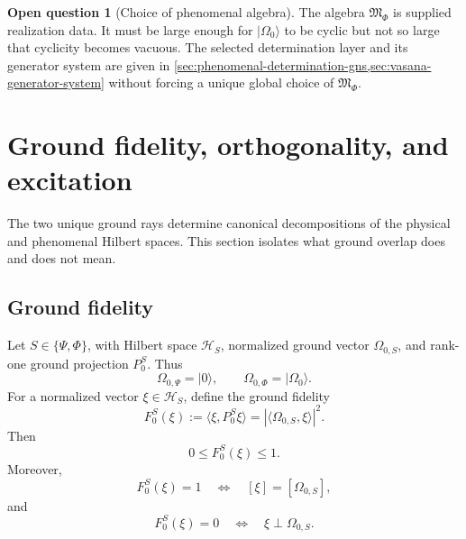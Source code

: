 \documentclass[11pt,reqno]{scrartcl}
\newcommand{\algF}{\mathfrak M_{\Phi}}
\newcommand{\ket}[1]{\lvert #1\rangle}
\newcommand{\inner}[2]{\langle #1,#2\rangle}
\theoremstyle{plain}
\theoremstyle{definition}
\newtheorem{openquestion}[openquestion]{Open question}
\theoremstyle{remark}
\begin{document}
\begin{openquestion}[Choice of phenomenal algebra]
\label{q:phenomenal-algebra}
The algebra $\algF$ is supplied realization data.  It must be large enough
for $\ket{\Omega_0}$ to be cyclic but not so large that cyclicity becomes
vacuous.  The selected determination layer and its generator system are given
in \cref{sec:phenomenal-determination-gns,sec:vasana-generator-system} without
forcing a unique global choice of $\algF$.
\end{openquestion}
\section{Ground fidelity, orthogonality, and excitation}
\label{sec:ground-fidelity}

The two unique ground rays determine canonical decompositions of the physical
and phenomenal Hilbert spaces.  This section isolates what ground overlap does
and does not mean.

\subsection{Ground fidelity}

Let $S\in\{\Psi,\Phi\}$, with Hilbert space $\mathscr H_S$, normalized ground
vector $\Omega_{0,S}$, and rank-one ground projection $P_0^S$.  Thus
\begin{equation}
  \Omega_{0,\Psi}=\ket0,
  \qquad
  \Omega_{0,\Phi}=\ket{\Omega_0}.
\end{equation}
For a normalized vector $\xi\in\mathscr H_S$, define the ground fidelity
\begin{equation}
  \boxed{
  F_0^S(\xi)
  :=\inner{\xi}{P_0^S\xi}
  =|\inner{\Omega_{0,S}}{\xi}|^2.}
  \label{eq:ground-fidelity-general}
\end{equation}
Then
\begin{equation}
  0\leq F_0^S(\xi)\leq1.
\end{equation}
Moreover,
\begin{equation}
  F_0^S(\xi)=1
  \quad\Longleftrightarrow\quad
  [\xi]=[\Omega_{0,S}],
  \label{eq:fidelity-one-ray}
\end{equation}
and
\begin{equation}
  F_0^S(\xi)=0
  \quad\Longleftrightarrow\quad
  \xi\perp\Omega_{0,S}.
  \label{eq:fidelity-zero-orthogonal}
\end{equation}
\end{document}
